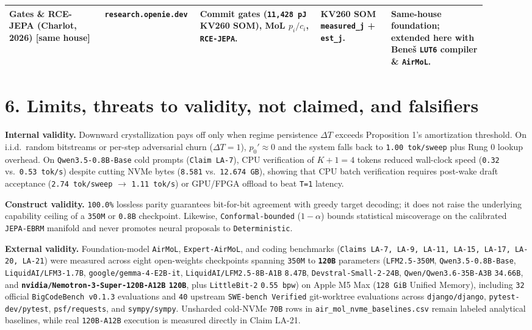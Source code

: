 \documentclass[10pt]{article}
\begin{document}
{\begin{longtable}{@{}L{0.19\linewidth}L{0.15\linewidth}L{0.24\linewidth}L{0.14\linewidth}L{0.19\linewidth}@{}}
\addlinespace[3pt]
\textbf{Gates} \& \textbf{RCE-JEPA} (Charlot, 2026) [same house] & \texttt{research.openie.dev} & Commit gates (\texttt{11,428 pJ} KV260 SOM), MoL $p_i/c_i$, \texttt{RCE-JEPA}. & KV260 SOM \texttt{measured\_j} + \texttt{est\_j}. & Same-house foundation; extended here with Bene\v{s} \texttt{LUT6} compiler \& \texttt{AirMoL}. \\
\bottomrule
\end{longtable}
}

\section{6. Limits, threats to validity, not claimed, and falsifiers}\label{limits}

\textbf{Internal validity.} Downward crystallization pays off only when regime persistence $\Delta T$ exceeds Proposition 1's amortization threshold. On i.i.d.\ random bitstreams or per-step adversarial churn ($\Delta T = 1$), $p_0' \approx 0$ and the system falls back to \texttt{1.00 tok/sweep} plus Rung 0 lookup overhead. On \texttt{Qwen3.5-0.8B-Base} cold prompts (\texttt{Claim LA-7}), CPU verification of $K+1 = 4$ tokens reduced wall-clock speed (\texttt{0.32} vs.\ \texttt{0.53 tok/s}) despite cutting NVMe bytes (\texttt{8.581} vs.\ \texttt{12.674 GB}), showing that CPU batch verification requires post-wake draft acceptance (\texttt{2.74 tok/sweep} $\to$ \texttt{1.11 tok/s}) or GPU/FPGA offload to beat \texttt{T=1} latency.

\textbf{Construct validity.} \texttt{100.0\%} lossless parity guarantees bit-for-bit agreement with greedy target decoding; it does not raise the underlying capability ceiling of a \texttt{350M} or \texttt{0.8B} checkpoint. Likewise, \texttt{Conformal-bounded} ($1-\alpha$) bounds statistical miscoverage on the calibrated \texttt{JEPA-EBRM} manifold and never promotes neural proposals to \texttt{Deterministic}.

\textbf{External validity.} Foundation-model \texttt{AirMoL}, \texttt{Expert-AirMoL}, and coding benchmarks (\texttt{Claims LA-7, LA-9, LA-11, LA-15, LA-17, LA-20, LA-21}) were measured across eight open-weights checkpoints spanning \texttt{350M} to \textbf{\texttt{120B}} parameters (\texttt{LFM2.5-350M}, \texttt{Qwen3.5-0.8B-Base}, \texttt{LiquidAI/LFM3-1.7B}, \texttt{google/gemma-4-E2B-it}, \texttt{LiquidAI/LFM2.5-8B-A1B} \texttt{8.47B}, \texttt{Devstral-Small-2-24B}, \texttt{Qwen/Qwen3.6-35B-A3B} \texttt{34.66B}, and \textbf{\texttt{nvidia/Nemotron-3-Super-120B-A12B} \texttt{120B}}, plus \texttt{LittleBit-2} \texttt{0.55 bpw}) on Apple M5 Max (\texttt{128 GiB} Unified Memory), including \texttt{32} official \texttt{BigCodeBench v0.1.3} evaluations and \texttt{40} upstream \texttt{SWE-bench Verified} git-worktree evaluations across \texttt{django/django}, \texttt{pytest-dev/pytest}, \texttt{psf/requests}, and \texttt{sympy/sympy}. Unsharded cold-NVMe \texttt{70B} rows in \texttt{air\_mol\_nvme\_baselines.csv} remain labeled analytical baselines, while real \texttt{120B-A12B} execution is measured directly in Claim LA-21.
\end{document}
